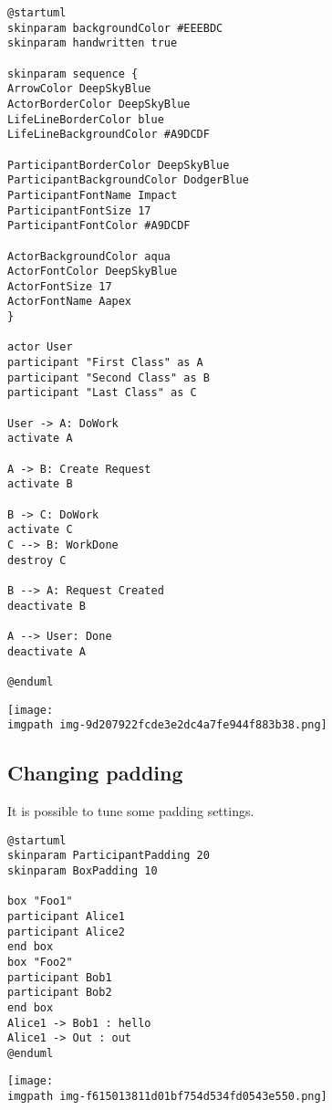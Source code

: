 \begin{verbatim}
@startuml
skinparam backgroundColor #EEEBDC
skinparam handwritten true

skinparam sequence {
ArrowColor DeepSkyBlue
ActorBorderColor DeepSkyBlue
LifeLineBorderColor blue
LifeLineBackgroundColor #A9DCDF

ParticipantBorderColor DeepSkyBlue
ParticipantBackgroundColor DodgerBlue
ParticipantFontName Impact
ParticipantFontSize 17
ParticipantFontColor #A9DCDF

ActorBackgroundColor aqua
ActorFontColor DeepSkyBlue
ActorFontSize 17
ActorFontName Aapex
}

actor User
participant "First Class" as A
participant "Second Class" as B
participant "Last Class" as C

User -> A: DoWork
activate A

A -> B: Create Request
activate B

B -> C: DoWork
activate C
C --> B: WorkDone
destroy C

B --> A: Request Created
deactivate B

A --> User: Done
deactivate A

@enduml
\end{verbatim}
\begin{center}
\texttt{[image: \\imgpath img-9d207922fcde3e2dc4a7fe944f883b38.png]}
\end{center}




%
%
\subsection{Changing padding}




It is possible to tune some padding settings.


\begin{verbatim}
@startuml
skinparam ParticipantPadding 20
skinparam BoxPadding 10

box "Foo1"
participant Alice1
participant Alice2
end box
box "Foo2"
participant Bob1
participant Bob2
end box
Alice1 -> Bob1 : hello
Alice1 -> Out : out
@enduml
\end{verbatim}
\begin{center}
\texttt{[image: \\imgpath img-f615013811d01bf754d534fd0543e550.png]}
\end{center}




